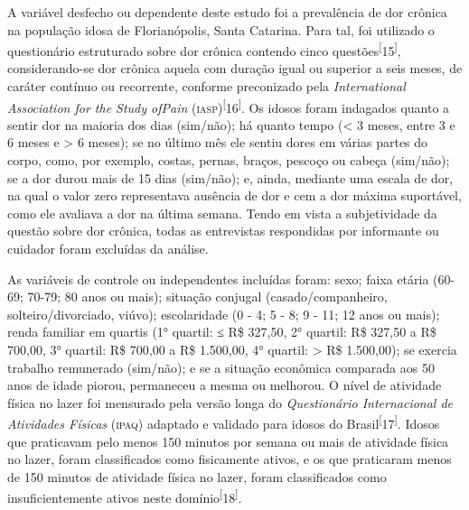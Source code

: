 \documentclass{article}
\begin{document}
A variável desfecho ou dependente deste estudo foi a prevalência de dor crônica
na população idosa de Florianópolis, Santa Catarina. Para tal, foi utilizado o
questionário estruturado sobre dor crônica contendo cinco
questões\textsuperscript{[}15\textsuperscript{]}, considerando-se dor crônica aquela com duração igual ou superior a seis meses,
de caráter contínuo ou recorrente, conforme preconizado pela
\textit{International Association for the Study ofPain}
(\textsc{iasp})\textsuperscript{[}16\textsuperscript{]}. Os idosos foram indagados quanto a sentir dor na maioria dos dias (sim/não);
há quanto tempo (< 3 meses, entre 3 e 6 meses e > 6 meses); se no último mês ele
sentiu dores em várias partes do corpo, como, por exemplo, costas, pernas,
braços, pescoço ou cabeça (sim/não); se a dor durou mais de 15 dias (sim/não);
e, ainda, mediante uma escala de dor, na qual o valor zero representava ausência
de dor e cem a dor máxima suportável, como ele avaliava a dor na última semana.
Tendo em vista a subjetividade da questão sobre dor crônica, todas as
entrevistas respondidas por informante ou cuidador foram excluídas da análise.

As variáveis de controle ou independentes incluídas foram: sexo; faixa etária
(60-69; 70-79; 80 anos ou mais); situação conjugal (casado/companheiro,
solteiro/divorciado, viúvo); escolaridade (0 - 4; 5 - 8; 9 - 11; 12 anos ou
mais); renda familiar em quartis (1° quartil: ≤ R\$ 327,50, 2° quartil: R\$
327,50 a R\$ 700,00, 3° quartil: R\$ 700,00 a R\$ 1.500,00, 4° quartil: > R\$
1.500,00); se exercia trabalho remunerado (sim/não); e se a situação econômica
comparada aos 50 anos de idade piorou, permaneceu a mesma ou melhorou. O nível
de atividade física no lazer foi mensurado pela versão longa do
\textit{Questionário Internacional de Atividades Físicas}
(\textsc{ipaq}) adaptado e validado para idosos do
Brasil\textsuperscript{[}17\textsuperscript{]}. Idosos que praticavam pelo menos 150 minutos por semana ou mais de atividade
física no lazer, foram classificados como fisicamente ativos, e os que
praticaram menos de 150 minutos de atividade física no lazer, foram
classificados como insuficientemente ativos neste
domínio\textsuperscript{[}18\textsuperscript{]}.
\end{document}
